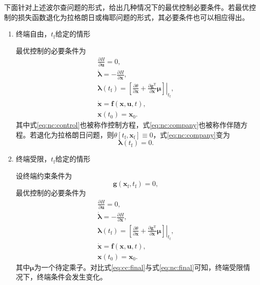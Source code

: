 下面针对上述波尔查问题的形式，给出几种情况下的最优控制必要条件。若最优控制的损失函数退化为拉格朗日或梅耶问题的形式，其必要条件也可以相应得出。
\\
\begin{enumerate}[wide=\parindent]
\item {\heiti 终端自由，$t_\mathrm{f}$给定的情形}

最优控制的必要条件为
\begin{gather}
\frac{\partial H}{\partial\bm{u}}=0,\label{eq:nc:control}\\
\dot{\bm{\lambda}}=-\frac{\partial H}{\partial\bm{x}},\label{eq:nc:company}\\
\bm{\lambda}(t_\mathrm{f})=\left. \left[\frac{\partial \theta}{\partial \bm{x}}+\frac{\partial \bm{g}^\mathrm{T}}{\partial \bm{x}}\bm{\mu}\right]\right|_{t_\mathrm{f}},\label{eq:nc:final}\\
\dot{\bm{x}}=\bm{f}(\bm{x},\bm{u},t),\\
\bm{x}(t_0)=\bm{x}_0.\label{eq:nc:last}
\end{gather}
其中式\eqref{eq:nc:control}也被称作{\heiti 控制方程}，式\eqref{eq:nc:company}也被称作{\heiti 伴随方程}。若退化为拉格朗日问题，则$\theta[t_\mathrm{f},\bm{x}_\mathrm{f}]\equiv 0$，式\eqref{eq:nc:company}变为
\begin{equation}
\bm{\lambda}(t_\mathrm{f})=0.
\end{equation}

\item {\heiti 终端受限，$t_\mathrm{f}$给定的情形}

设终端约束条件为
\begin{equation}
\bm{g}(\bm{x}_\mathrm{f},t_\mathrm{f})=0,
\end{equation}
最优控制的必要条件为
\begin{gather}
\frac{\partial H}{\partial\bm{u}}=0,\label{eq:cc:control}\\
\dot{\bm{\lambda}}=-\frac{\partial H}{\partial\bm{x}},\label{eq:cc:company}\\
\bm{\lambda}(t_\mathrm{f})=\left. [\frac{\partial \theta}{\partial \bm{x}}+\frac{\partial \bm{g}^\mathrm{T}}{\partial \bm{x}}\bm{\mu}]\right|_{t_\mathrm{f}},\label{eq:cc:final}\\
\dot{\bm{x}}=\bm{f}(\bm{x},\bm{u},t),\\
\bm{x}(t_0)=\bm{x}_0.\label{eq:cc:last}
\end{gather}
其中$\bm{\mu}$为一个待定乘子。对比式\eqref{eq:cc:final}与式\eqref{eq:nc:final}可知，终端受限情况下，终端条件会发生变化。


\end{enumerate}
